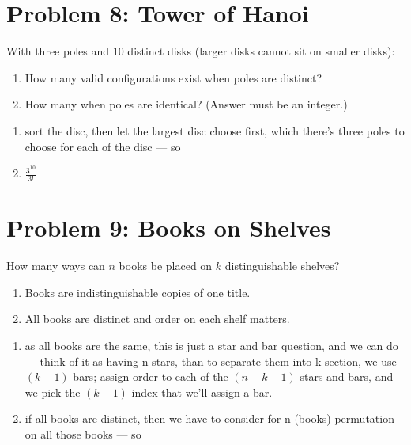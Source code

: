 \vspace{1em}
\hrulefill

\section*{Problem 8: Tower of Hanoi}
With three poles and 10 distinct disks (larger disks cannot sit on smaller disks):
\begin{enumerate}[label=\arabic*.]
    \item How many valid configurations exist when poles are distinct?
    \item How many when poles are identical? (Answer must be an integer.)
\end{enumerate}

\medskip
\solution

\begin{enumerate}
    \item sort the disc, then let the largest disc choose first, which there's three poles to choose for each of the disc --- so 
    \item $\frac{3^{10}}{3!}$
\end{enumerate}

\vspace{1em}
\hrulefill

\section*{Problem 9: Books on Shelves}
How many ways can $n$ books be placed on $k$ distinguishable shelves?
\begin{enumerate}[label=\arabic*.]
    \item Books are indistinguishable copies of one title.
    \item All books are distinct and order on each shelf matters.
\end{enumerate}

\medskip
\solution

\begin{enumerate}
    \item as all books are the same, this is just a star and bar question, and we can do  --- think of it as having n stars, than to separate them into k section, we use $(k-1)$ bars; assign order to each of the $(n+k-1)$ stars and bars, and we pick the $(k-1)$ index that we'll assign a bar.
    \item if all books are distinct, then we have to consider for n (books) permutation on all those books --- so 
\end{enumerate}


